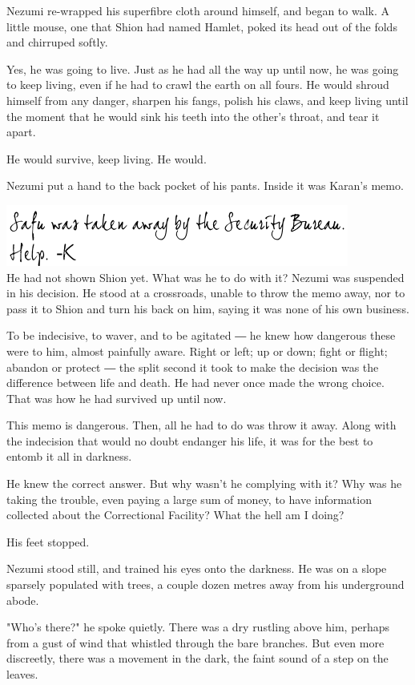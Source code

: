 Nezumi re-wrapped his superfibre cloth around himself, and began to
walk. A little mouse, one that Shion had named Hamlet, poked its head
out of the folds and chirruped softly.

Yes, he was going to live. Just as he had all the way up until now, he
was going to keep living, even if he had to crawl the earth on all
fours. He would shroud himself from any danger, sharpen his fangs,
polish his claws, and keep living until the moment that he would sink
his teeth into the other's throat, and tear it apart.

He would survive, keep living. He would.

Nezumi put a hand to the back pocket of his pants. Inside it was Karan's
memo.

\includegraphics{Images/memo5.png}\\

He had not shown Shion yet. What was he to do with it? Nezumi was
suspended in his decision. He stood at a crossroads, unable to throw the
memo away, nor to pass it to Shion and turn his back on him, saying it
was none of his own business.

To be indecisive, to waver, and to be agitated ― he knew how dangerous
these were to him, almost painfully aware. Right or left; up or down;
fight or flight; abandon or protect ― the split second it took to make
the decision was the difference between life and death. He had never
once made the wrong choice. That was how he had survived up until now.

This memo is dangerous. Then, all he had to do was throw it away. Along
with the indecision that would no doubt endanger his life, it was for
the best to entomb it all in darkness.

He knew the correct answer. But why wasn't he complying with it? Why was
he taking the trouble, even paying a large sum of money, to have
information collected about the Correctional Facility? What the hell am
I doing?

His feet stopped.

Nezumi stood still, and trained his eyes onto the darkness. He was on a
slope sparsely populated with trees, a couple dozen metres away from his
underground abode.

"Who's there?" he spoke quietly. There was a dry rustling above him,
perhaps from a gust of wind that whistled through the bare branches. But
even more discreetly, there was a movement in the dark, the faint sound
of a step on the leaves.

